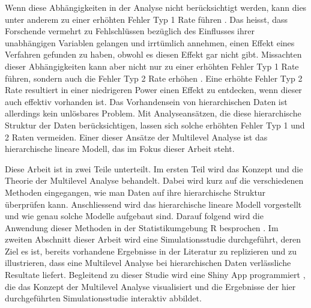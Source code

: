 \documentclass[12pt, a4paper]{article}\usepackage[]{graphicx}\usepackage[]{color}
\begin{document}
Wenn diese Abhängigkeiten in der Analyse nicht berücksichtigt werden, kann dies unter anderem zu einer erhöhten Fehler Typ 1 Rate führen \citep{dorman2008effect, mcneish2014analyzing}. Das heisst, dass Forschende vermehrt zu Fehlschlüssen bezüglich des Einflusses ihrer unabhängigen Variablen gelangen und irrtümlich annehmen, einen Effekt eines Verfahren gefunden zu haben, obwohl es diesen Effekt gar nicht gibt. Missachten dieser Abhängigkeiten kann aber nicht nur zu einer erhöhten Fehler Typ 1 Rate führen, sondern auch die Fehler Typ 2 Rate erhöhen \citep{MOERBEEK2003341}. Eine erhöhte Fehler Typ 2 Rate resultiert in einer niedrigeren Power einen Effekt zu entdecken, wenn dieser auch effektiv vorhanden ist. Das Vorhandensein von hierarchischen Daten ist allerdings kein unlösbares Problem. Mit Analyseansätzen, die diese hierarchische Struktur der Daten berücksichtigen, lassen sich solche erhöhten Fehler Typ 1 und 2 Raten vermeiden. Einer dieser Ansätze der Multilevel Analyse ist das hierarchische lineare Modell, das im Fokus dieser Arbeit steht.

Diese Arbeit ist in zwei Teile unterteilt. Im ersten Teil wird das Konzept und die Theorie der Multilevel Analyse behandelt. Dabei wird kurz auf die verschiedenen Methoden eingegangen, wie man Daten auf ihre hierarchische Struktur überprüfen kann. Anschliessend wird das hierarchische lineare Modell vorgestellt und wie genau solche Modelle aufgebaut sind. Darauf folgend wird die Anwendung dieser Methoden in der Statistikumgebung R besprochen \citep{R}. Im zweiten Abschnitt dieser Arbeit wird eine Simulationsstudie durchgeführt, deren Ziel es ist, bereits vorhandene Ergebnisse in der Literatur zu replizieren und zu illustrieren, dass eine Multilevel Analyse bei hierarchischen Daten verlässliche Resultate liefert. Begleitend zu dieser Studie wird eine Shiny App programmiert \citep{shiny}, die das Konzept der Multilevel Analyse visualisiert und die Ergebnisse der hier durchgeführten Simulationsstudie interaktiv abbildet.
\end{document}

